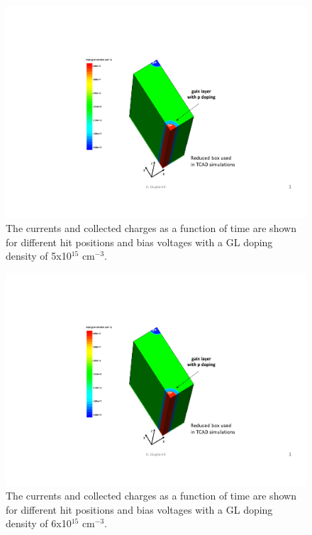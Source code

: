 \documentclass[aps,pt14,superscriptaddress,showpacs,floatfix,nofootinbib]{revtex4}
\begin{document}
\begin{figure}[hbtp]
\begin{center}
\includegraphics[page=8,width=0.5\textheight,keepaspectratio]{figures/IBL-3DwithGainLayer_20190610_toWeiming.pdf}
\caption{The currents and collected charges as a function of time are shown for different
hit positions and bias voltages with a GL doping density of 5x10$^{15}$ cm$^{-3}$.\label{fig:drift3}}
\end{center}
\end{figure}

\begin{figure}[hbtp]
\begin{center}
\includegraphics[page=9,width=0.5\textheight,keepaspectratio]{figures/IBL-3DwithGainLayer_20190610_toWeiming.pdf}
\caption{The currents and collected charges as a function of time are shown for different
hit positions and bias voltages with a GL doping density of 6x10$^{15}$ cm$^{-3}$.\label{fig:drift4}}
\end{center}
\end{figure}
\end{document}
